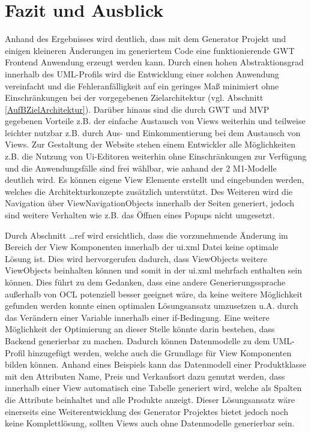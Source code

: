 \chapter{Fazit und Ausblick}
\label{FazitAusblick}
Anhand des Ergebnisses wird deutlich, dass mit dem Generator Projekt und einigen
kleineren Änderungen im generiertem Code eine funktionierende GWT Frontend
Anwendung erzeugt werden kann. Durch einen
hohen Abstraktionsgrad innerhalb des UML-Profils wird die Entwicklung einer solchen Anwendung 
vereinfacht und die Fehleranfälligkeit auf ein geringes Maß minimiert ohne
Einschränkungen bei der vorgegebenen Zielarchitektur (vgl. Abschnitt
\ref{AufBZielArchitektur}).
Darüber hinaus sind die durch GWT und MVP gegebenen Vorteile z.B. der
einfache Austausch von Views weiterhin und teilweise leichter nutzbar z.B.
durch Aus- und Einkommentierung bei dem Austausch von Views. Zur Gestaltung der
Website stehen einem Entwickler alle Möglichkeiten z.B. die
Nutzung von Ui-Editoren weiterhin ohne Einschränkungen zur Verfügung und die
Anwendungsfälle sind frei wählbar, wie anhand der 2 M1-Modelle deutlich wird.
Es können eigene View Elemente erstellt und eingebunden werden, welches die
Architekturkonzepte zusätzlich unterstützt. Des Weiteren wird die Navigation
über ViewNavigationObjects innerhalb der Seiten generiert, jedoch sind weitere
Verhalten wie z.B. das Öffnen eines Popups nicht umgesetzt.

Durch Abschnitt \ldots ref wird ersichtlich, dass die vorzunehmende Änderung im
Bereich der View Komponenten innerhalb der ui.xml Datei keine optimale Lösung ist. Dies wird hervorgerufen
dadurch, dass ViewObjects weitere ViewObjects beinhalten können und somit in der
ui.xml mehrfach enthalten sein können. Dies führt zu dem Gedanken, dass eine
andere Generierungssprache außerhalb von OCL potenziell besser geeignet wäre, da
keine weitere Möglichkeit gefunden werden konnte einen optimalen Lösungsansatz
umzusetzen u.A. durch das Verändern einer Variable innerhalb einer if-Bedingung.
Eine weitere Möglichkeit der Optimierung an dieser Stelle könnte darin bestehen,
dass Backend generierbar zu machen. Dadurch können Datenmodelle zu dem
UML-Profil hinzugefügt werden, welche auch die Grundlage für View Komponenten
bilden können. Anhand eines
Beispiels kann das Datenmodell einer Produktklasse mit den Attributen Name,
Preis und Verkaufsort dazu genutzt werden, dass innerhalb einer View automatisch
eine Tabelle generiert wird, welche als Spalten die Attribute beinhaltet und
alle Produkte anzeigt. Dieser Lösungsansatz wäre einerseits eine
Weiterentwicklung des Generator Projektes bietet jedoch noch keine
Komplettlösung, sollten Views auch ohne Datenmodelle generierbar sein.

